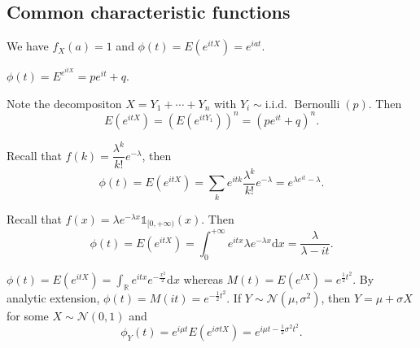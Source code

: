\documentclass[11pt,singlecolumn, openany, citestyle=authoryear]{elegantbook}
\begin{document}
\begin{CJK}{UTF8}{gbsn}
\section{Common characteristic functions}
\begin{example} We have $f_X(a)=1$ and 
    $\phi(t)=E(e^{itX})=e^{iat}$.
\end{example}
\begin{example}[(Bernoulli$(p)$)]
    $\phi(t)=E^{e^{itX}}=pe^{it}+q$.
\end{example}
\begin{example}[(Binomial$(n,p)$)]
    Note the decompositon $X=Y_1+\cdots+Y_n$ with $Y_i\sim \text{i.i.d. } \operatorname{Bernoulli}(p)$.
    Then 
    $$
    E(e^{itX})=(E(e^{itY_1}))^n = (pe^{it}+q)^n.
    $$
\end{example}
\begin{example}
    Recall that $f(k)=\dfrac{\lambda^k}{k!}e^{-\lambda}$, then 
    $$
    \phi(t)=E(e^{itX})=\sum_k e^{itk}\frac{\lambda^k}{k!}e^{-\lambda}=e^{\lambda e^{it}-\lambda}.
    $$
\end{example}
\begin{example}
    Recall that $f(x)=\lambda e^{-\lambda x}\mathds{1}_{[0,+\infty)}(x)$. Then 
    $$
    \phi(t)=E(e^{itX}) = \int_0^{+\infty} e^{itx}\lambda e^{-\lambda x}\mathrm{d}x = 
    \frac{\lambda}{\lambda - it}.
    $$
\end{example}
\begin{example}[(Normal)]
    $\phi(t)=E(e^{itX})=\displaystyle \int_{\mathbb{R}}e^{itx}e^{-\frac{x^2}{2}}\mathrm{d}x$
    whereas 
    $M(t)=E(e^{tX})=e^{\frac{1}{2}t^2}$. By analytic extension, $\phi(t)=
    M(it)=e^{-\frac{1}{2}t^2}$.
    If $Y\sim \mathcal{N}(\mu,\sigma^2)$, then $Y=\mu + \sigma X$ for some $X\sim 
    \mathcal{N}(0,1)$ and 
    $$\phi_Y(t)=e^{i\mu t} E(e^{i\sigma t X})= 
    e^{i\mu t-\frac{1}{2}\sigma^2 t^2}.$$ 
\end{example}
\end{CJK}
\end{document}
